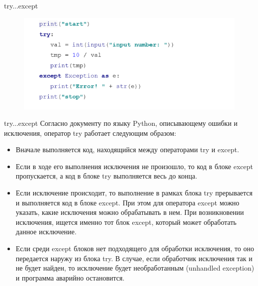 \documentclass[xcolor=table]{beamer}
\begin{document}
\begin{frame}{try...except}
	\begin{figure}[h]
		\centering
		\includegraphics[scale=0.7]{images/lec08-pic03-python.png}
	\end{figure}
\end{frame}

\begin{frame}{try...except}
	Согласно документу по языку Python, описывающему ошибки и исключения, оператор try работает следующим образом:
	\begin{itemize}
		\item Вначале выполняется код, находящийся между операторами try и except.
		\item Если в ходе его выполнения исключения не произошло, то код в блоке except пропускается, а код в блоке try выполняется весь до конца.
		\item Если исключение происходит, то выполнение в рамках блока try прерывается и выполняется код в блоке except. При этом для оператора except можно указать, какие исключения можно обрабатывать в нем. При возникновении исключения, ищется именно тот блок except, который может обработать данное исключение.
		\item Если среди except блоков нет подходящего для обработки исключения, то оно передается наружу из блока try. В случае, если обработчик исключения так и не будет найден, то исключение будет необработанным (unhandled exception) и программа аварийно остановится.	
	\end{itemize}
\end{frame}
\end{document}
